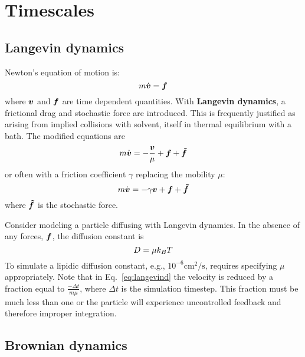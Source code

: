 
\section{ Timescales } \label{sec:timescales}

\subsection{Langevin dynamics}

Newton's equation of motion is:
\begin{equation}
m \dot{\boldsymbol{v}} = \boldsymbol{f}
\end{equation}
where $\boldsymbol{v}$ and $\boldsymbol{f}$ are time dependent quantities.
With {\bf Langevin dynamics}, a frictional drag and stochastic force are introduced.
This is frequently justified as arising from implied collisions with solvent, itself in thermal equilibrium with a bath.
The modified equations are
\begin{equation}
m \dot{\boldsymbol{v}} = -\frac{\boldsymbol{v}}{\mu} + \boldsymbol{f} + \boldsymbol{\tilde{f}}
\end{equation}
or often with a friction coefficient $\gamma$ replacing the mobility $\mu$:
\begin{equation}
\label{eq:langevind}
m \dot{\boldsymbol{v}} = -\gamma \boldsymbol{v} + \boldsymbol{f} + \boldsymbol{\tilde{f}}
\end{equation}
where $\boldsymbol{\tilde{f}}$ is the stochastic force.

Consider modeling a particle diffusing with Langevin dynamics.
In the absence of any forces, $\boldsymbol{f}$, the diffusion constant is
\begin{equation}
D = \mu k_B T
\end{equation}
To simulate a lipidic diffusion constant, e.g., $10^{-6} \textrm{cm}^2/\textrm{s}$, requires specifying $\mu$ appropriately.
Note that in Eq.~\ref{eq:langevind} the velocity is reduced by a fraction equal to $\frac{-\Delta t}{m \mu}$,
where $\Delta t$ is the simulation timestep.
This fraction must be much less than one or the particle will experience uncontrolled feedback and therefore improper integration.

\subsection{Brownian dynamics}


